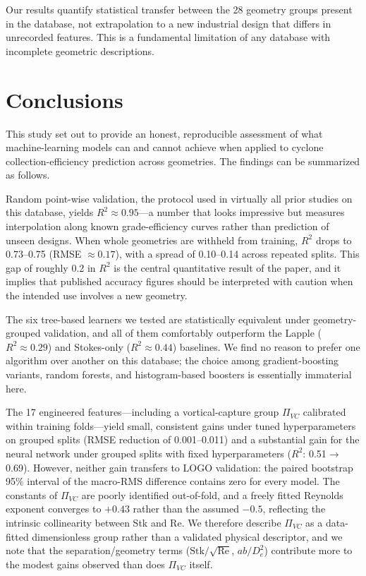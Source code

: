 \documentclass[12pt]{article}
\newcommand{\Stk}{\mathrm{Stk}}
\newcommand{\Rey}{\mathrm{Re}}
\newcommand{\PiVC}{\Pi_{VC}}
\begin{document}
Our results quantify statistical transfer between the 28 geometry groups present in the database, not extrapolation to a new industrial design that differs in unrecorded features. This is a fundamental limitation of any database with incomplete geometric descriptions.

\section{Conclusions}

This study set out to provide an honest, reproducible assessment of what machine-learning models can and cannot achieve when applied to cyclone collection-efficiency prediction across geometries. The findings can be summarized as follows.

Random point-wise validation, the protocol used in virtually all prior studies on this database, yields $R^2 \approx 0.95$---a number that looks impressive but measures interpolation along known grade-efficiency curves rather than prediction of unseen designs. When whole geometries are withheld from training, $R^2$ drops to 0.73--0.75 (RMSE $\approx 0.17$), with a spread of 0.10--0.14 across repeated splits. This gap of roughly 0.2 in $R^2$ is the central quantitative result of the paper, and it implies that published accuracy figures should be interpreted with caution when the intended use involves a new geometry.

The six tree-based learners we tested are statistically equivalent under geometry-grouped validation, and all of them comfortably outperform the Lapple ($R^2 \approx 0.29$) and Stokes-only ($R^2 \approx 0.44$) baselines. We find no reason to prefer one algorithm over another on this database; the choice among gradient-boosting variants, random forests, and histogram-based boosters is essentially immaterial here.

The 17 engineered features---including a vortical-capture group $\PiVC$ calibrated within training folds---yield small, consistent gains under tuned hyperparameters on grouped splits (RMSE reduction of 0.001--0.011) and a substantial gain for the neural network under grouped splits with fixed hyperparameters ($R^2$: 0.51$\to$0.69). However, neither gain transfers to LOGO validation: the paired bootstrap 95\% interval of the macro-RMS difference contains zero for every model. The constants of $\PiVC$ are poorly identified out-of-fold, and a freely fitted Reynolds exponent converges to $+0.43$ rather than the assumed $-0.5$, reflecting the intrinsic collinearity between Stk and Re. We therefore describe $\PiVC$ as a data-fitted dimensionless group rather than a validated physical descriptor, and we note that the separation/geometry terms ($\Stk/\sqrt{\Rey}$, $ab/D_e^2$) contribute more to the modest gains observed than does $\PiVC$ itself.
\end{document}
